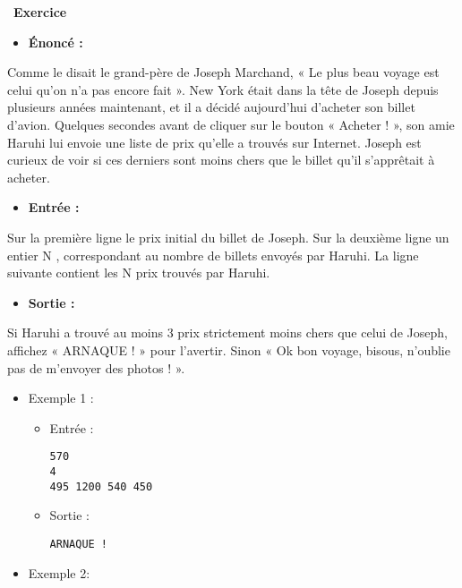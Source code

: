 \documentclass[
  10pt,
]{article}
\providecommand{\tightlist}{%
  \setlength{\itemsep}{0pt}\setlength{\parskip}{0pt}}
\newcounter{exo}
\newenvironment{exercice}[1]
{\par \medskip   \addtocounter{exo}{1} \noindent  
\begin{bclogo}[arrondi =0.1,   noborder = true, logo=\bccrayon, marge=4]{~\textbf{Exercice} \textbf{\theexo} {\itshape #1} }  \par}
{
\end{bclogo}
 \par \bigskip }
\begin{document}
\begin{exercice}{}

\begin{itemize}
\tightlist
\item
  \textbf{Énoncé :}
\end{itemize}

Comme le disait le grand-père de Joseph Marchand, « Le plus beau voyage
est celui qu'on n'a pas encore fait ». New York était dans la tête de
Joseph depuis plusieurs années maintenant, et il a décidé aujourd'hui
d'acheter son billet d'avion. Quelques secondes avant de cliquer sur le
bouton « Acheter ! », son amie Haruhi lui envoie une liste de prix
qu'elle a trouvés sur Internet. Joseph est curieux de voir si ces
derniers sont moins chers que le billet qu'il s'apprêtait à acheter.

\begin{itemize}
\tightlist
\item
  \textbf{Entrée :}
\end{itemize}

Sur la première ligne le prix initial du billet de Joseph. Sur la
deuxième ligne un entier N , correspondant au nombre de billets envoyés
par Haruhi. La ligne suivante contient les N prix trouvés par Haruhi.

\begin{itemize}
\tightlist
\item
  \textbf{Sortie :}
\end{itemize}

Si Haruhi a trouvé au moins 3 prix strictement moins chers que celui de
Joseph, affichez « ARNAQUE ! » pour l'avertir. Sinon « Ok bon voyage,
bisous, n'oublie pas de m'envoyer des photos ! ».

\begin{itemize}
\item
  Exemple 1 :

  \begin{itemize}
  \item
    Entrée :

\begin{lstlisting}
570
4
495 1200 540 450
\end{lstlisting}
  \item
    Sortie :

\begin{lstlisting}
ARNAQUE !
\end{lstlisting}
  \end{itemize}
\item
  Exemple 2:


\end{itemize}
\end{exercice}
\end{document}
